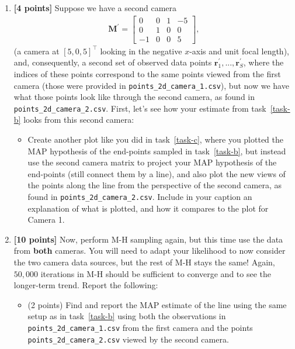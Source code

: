 \documentclass[10pt]{article}
\begin{document}
\begin{enumerate}
\item \label{task-e} {\bf [4 points]} Suppose we have a second camera
\begin{eqnarray*}
\mathbf{M}^{\prime} =
\begin{bmatrix}
0 & 0 & 1 & -5 \\
0 & 1 & 0 & 0 \\
-1 & 0 & 0 & 5
\end{bmatrix} ,
\end{eqnarray*}
(a camera at $[5, 0, 5]^{\top}$ looking in the negative $x$-axis and unit focal length), 
and, consequently, a second set of observed data points $\mathbf{r}^{\prime}_1, ..., \mathbf{r}^{\prime}_S$, where the indices of these points correspond to the same points viewed from the first camera (those were provided in {\tt points\_2d\_camera\_1.csv}), but now we have what those points look like through the second camera, as found in {\tt points\_2d\_camera\_2.csv}.  First, let's see how your estimate from task~\ref{task-b} looks from this second camera:
\begin{itemize}
\item Create another plot like you did in task~\ref{task-c}, where you plotted the MAP hypothesis of the end-points sampled in task~\ref{task-b}, but instead use the second camera matrix to project your MAP hypothesis of the end-points (still connect them by a line), and also plot the new views of the points along the line from the perspective of the second camera, as found in {\tt points\_2d\_camera\_2.csv}. Include in your caption an explanation of what is plotted, and how it compares to the plot for Camera 1.


\end{itemize}

\item {\bf [10 points]} \label{task-f} Now, perform M-H sampling again, but this time use the data from {\bf both} cameras.  You will need to adapt your likelihood to now consider the two camera data sources, but the rest of M-H stays the same!  Again, $50,000$ iterations in M-H should be sufficient to converge and to see the longer-term trend.
Report the following:
\begin{itemize}
\item (2 points) Find and report the MAP estimate of the line using the same setup as in task~\ref{task-b} using both the observations in {\tt points\_2d\_camera\_1.csv} from the first camera and the points {\tt points\_2d\_camera\_2.csv} viewed by the second camera.



\end{itemize}
\end{enumerate}
\end{document}
